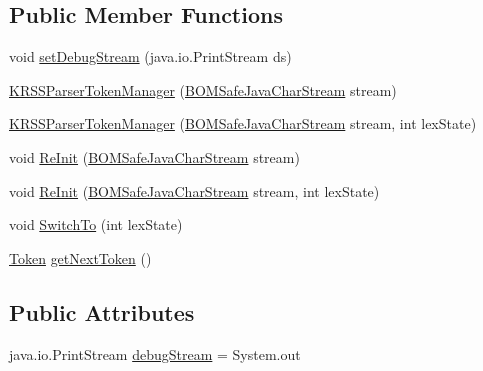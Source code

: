\subsection*{Public Member Functions}
\begin{DoxyCompactItemize}
\item 
void \hyperlink{classorg_1_1coode_1_1owl_1_1krssparser_1_1_k_r_s_s_parser_token_manager_ab5220732f0b417a1e8ce0f4571f5aaf6}{set\-Debug\-Stream} (java.\-io.\-Print\-Stream ds)
\item 
\hyperlink{classorg_1_1coode_1_1owl_1_1krssparser_1_1_k_r_s_s_parser_token_manager_ae10761623cf994b02dfa75b72f3496a6}{K\-R\-S\-S\-Parser\-Token\-Manager} (\hyperlink{classuk_1_1ac_1_1manchester_1_1cs_1_1_b_o_m_safe_java_char_stream}{B\-O\-M\-Safe\-Java\-Char\-Stream} stream)
\item 
\hyperlink{classorg_1_1coode_1_1owl_1_1krssparser_1_1_k_r_s_s_parser_token_manager_a1206b99a1e0e5b969bce04389ac49698}{K\-R\-S\-S\-Parser\-Token\-Manager} (\hyperlink{classuk_1_1ac_1_1manchester_1_1cs_1_1_b_o_m_safe_java_char_stream}{B\-O\-M\-Safe\-Java\-Char\-Stream} stream, int lex\-State)
\item 
void \hyperlink{classorg_1_1coode_1_1owl_1_1krssparser_1_1_k_r_s_s_parser_token_manager_abe5970c3d86ed0121d769174c506125c}{Re\-Init} (\hyperlink{classuk_1_1ac_1_1manchester_1_1cs_1_1_b_o_m_safe_java_char_stream}{B\-O\-M\-Safe\-Java\-Char\-Stream} stream)
\item 
void \hyperlink{classorg_1_1coode_1_1owl_1_1krssparser_1_1_k_r_s_s_parser_token_manager_a76bc062e52734a2ef02e9a4b391c6aec}{Re\-Init} (\hyperlink{classuk_1_1ac_1_1manchester_1_1cs_1_1_b_o_m_safe_java_char_stream}{B\-O\-M\-Safe\-Java\-Char\-Stream} stream, int lex\-State)
\item 
void \hyperlink{classorg_1_1coode_1_1owl_1_1krssparser_1_1_k_r_s_s_parser_token_manager_acb2a0b3ebb996aca0df7d4923d7661c2}{Switch\-To} (int lex\-State)
\item 
\hyperlink{classorg_1_1coode_1_1owl_1_1krssparser_1_1_token}{Token} \hyperlink{classorg_1_1coode_1_1owl_1_1krssparser_1_1_k_r_s_s_parser_token_manager_a55e30dfbb0fb1fac2863f90e9dd003b7}{get\-Next\-Token} ()
\end{DoxyCompactItemize}
\subsection*{Public Attributes}
\begin{DoxyCompactItemize}
\item 
java.\-io.\-Print\-Stream \hyperlink{classorg_1_1coode_1_1owl_1_1krssparser_1_1_k_r_s_s_parser_token_manager_aea5bbf22c648f017bd54b1d7055ccfdb}{debug\-Stream} = System.\-out
\end{DoxyCompactItemize}
